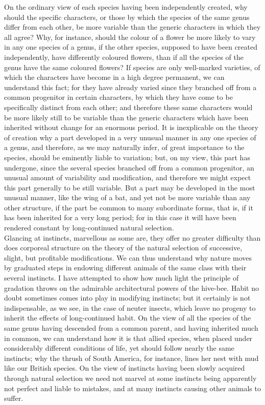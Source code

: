 \indent On the ordinary view of each species having been independently created, why should the specific characters, or those by which the species of the same genus differ from each other, be more variable than the generic characters in which they all agree? Why, for instance, should the colour of a flower be more likely to vary in any one species of a genus, if the other species, supposed to have been created independently, have differently coloured flowers, than if all the species of the genus have the same coloured flowers?  If species are only well-marked varieties, of which the characters have become in a high degree permanent, we can understand this fact; for they have already varied since they branched off from a common progenitor in certain characters, by which they have come to be specifically distinct from each other; and therefore these same characters would be more likely still to be variable than the generic characters which have been inherited without change for an enormous period. It is inexplicable on the theory of creation why a part developed in a very unusual manner in any one species of a genus, and therefore, as we may naturally infer, of great importance to the species, should be eminently liable to variation; but, on my view, this part has undergone, since the several species branched off from a common progenitor, an unusual amount of variability and modification, and therefore we might expect this part generally to be still variable. But a part may be developed in the most unusual manner, like the wing of a bat, and yet not be more variable than any other structure, if the part be common to many subordinate forms, that is, if it has been inherited for a very long period; for in this case it will have been rendered constant by long-continued natural selection.~\\
\indent Glancing at instincts, marvellous as some are, they offer no greater difficulty than does corporeal structure on the theory of the natural selection of successive, slight, but profitable modifications.  We can thus understand why nature moves by graduated steps in endowing different animals of the same class with their several instincts. I have attempted to show how much light the principle of gradation throws on the admirable architectural powers of the hive-bee.  Habit no doubt sometimes comes into play in modifying instincts; but it certainly is not indispensable, as we see, in the case of neuter insects, which leave no progeny to inherit the effects of long-continued habit. On the view of all the species of the same genus having descended from a common parent, and having inherited much in common, we can understand how it is that allied species, when placed under considerably different conditions of life, yet should follow nearly the same instincts; why the thrush of South America, for instance, lines her nest with mud like our British species. On the view of instincts having been slowly acquired through natural selection we need not marvel at some instincts being apparently not perfect and liable to mistakes, and at many instincts causing other animals to suffer.~\\
